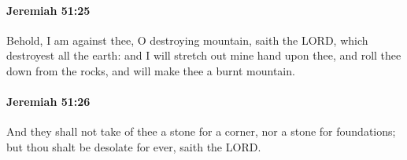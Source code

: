 		\paragraph{Jeremiah 51:25} %
			\label{JEREMIAH-51-25}

			Behold, I am against thee, O destroying mountain, saith the LORD, which destroyest all the earth: and I will stretch out mine hand upon thee, and roll thee down from the rocks, and will make thee a burnt mountain.


		\paragraph{Jeremiah 51:26} %
			\label{JEREMIAH-51-26}

			And they shall not take of thee a stone for a corner, nor a stone for foundations; but thou shalt be desolate for ever, saith the LORD.


